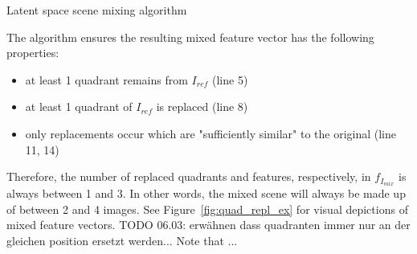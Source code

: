 \documentclass[12pt,a4paper]{article}
\begin{document}
\begin{algorithm}[H]
\DontPrintSemicolon
\LinesNumbered
{}
\caption{Latent space scene mixing algorithm}\label{alg:img_mixing_algo}
\end{algorithm}

The algorithm ensures the resulting mixed feature vector has the following properties:
\begin{itemize}
   \item at least 1 quadrant remains from $I_{ref}$ (line 5)
   \item at least 1 quadrant of $I_{ref}$ is replaced (line 8)
   \item only replacements occur which are "sufficiently similar" to the original (line 11, 14)
\end{itemize}
Therefore, the number of replaced quadrants and features, respectively, in $f_{I_{mix}}$ is always between 1 and 3. In other words, the mixed scene will always be made up of between 2 and 4 images. See Figure~\ref{fig:quad_repl_ex} for visual depictions of mixed feature vectors.
TODO 06.03: erwähnen dass quadranten immer nur an der gleichen position ersetzt werden... Note that ... 
\end{document}
